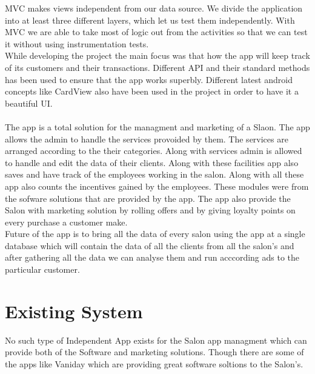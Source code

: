 MVC makes views independent from our data source. We divide the application into at least three different layers, which let us test them independently. With MVC we are able to take most of logic out from the activities so that we can test it without using instrumentation tests.\\

While developing the project the main focus was that how the app will keep track of its customers and their transactions. Different API and their standard methods has been used to ensure that the app works superbly. Different latest android concepts like CardView also have been used in the project in order to have it a beautiful UI.\\
\\
The app is a total solution for the managment and marketing of a Slaon. The app allows the admin to handle the services provoided by them. The services are arranged according to the their categories. Along with services admin is allowed to handle and edit the data of their clients. Along with these facilities app also saves and have track of the employees working in the salon. Along with all these app also counts the incentives gained by the employees. These modules were from the sofware solutions that are provided by the app. The app also provide the Salon with marketing solution by rolling offers and by giving loyalty points on every purchase a customer make. 
\\

Future of the app is to bring all the data of every salon using the app at a single database which will contain the data of all the clients from all the salon's and after gathering all the data we can analyse them and run acccording ads to the particular customer.

\section{Existing System}
No such type of Independent App exists for the Salon app managment which can provide both of the Software and marketing solutions. Though there are some of the apps like Vaniday which are providing great software soltions to the Salon's.

